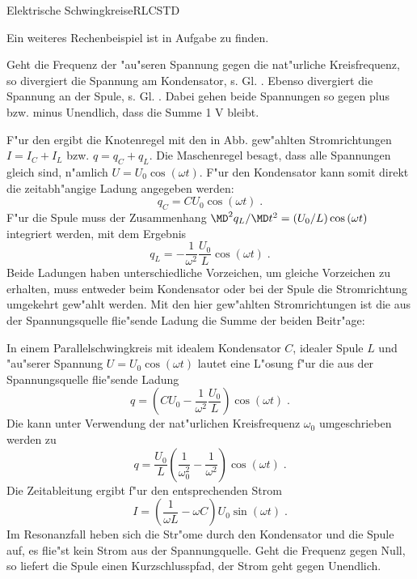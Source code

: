 \begin{MXContent}{Elektrische Schwingkreise}{RLC}{STD}
\begin{MExample}
\end{MExample}

Ein weiteres Rechenbeispiel ist in Aufgabe
zu finden.

Geht die Frequenz der "au"seren Spannung gegen die nat"urliche Kreisfrequenz, so divergiert die Spannung am Kondensator, s. Gl. . Ebenso divergiert die Spannung an der Spule, s. Gl. . Dabei gehen beide Spannungen so gegen plus bzw. minus Unendlich, dass die Summe 1 V bleibt.

F"ur den  ergibt die Knotenregel mit den in Abb.  gew"ahlten Stromrichtungen $I=I_C+I_L$ bzw. $q=q_C+q_L$. Die Maschenregel besagt, dass alle Spannungen gleich sind, n"amlich $U=U_0\cos\left(\omega t\right)$. F"ur den Kondensator kann somit direkt die zeitabh"angige Ladung angegeben werden:
\begin{equation}
  q_C= C U_0 \cos\left(\omega t\right)\; .
\end{equation}
F"ur die Spule muss der Zusammenhang $\MD^2 q_L / \MD t^2 = (U_0/L)\cos\left(\omega t\right)$ integriert werden, mit dem Ergebnis
\begin{equation}
  q_L= -\frac{1}{\omega^2}\frac{U_0}{L} \cos\left(\omega t\right)\; .
\end{equation}
Beide Ladungen haben unterschiedliche Vorzeichen, um gleiche Vorzeichen zu erhalten, muss entweder beim Kondensator oder bei der Spule die Stromrichtung umgekehrt gew"ahlt werden. Mit den hier gew"ahlten Stromrichtungen ist die aus der Spannungsquelle flie"sende Ladung die Summe der beiden Beitr"age:

\begin{MInfo}
In einem Parallelschwingkreis mit idealem Kondensator $C$, idealer Spule $L$ und "au"serer Spannung $U=U_0\cos\left(\omega t\right)$ lautet eine L"osung f"ur die aus der Spannungsquelle flie"sende Ladung
\begin{equation}
q=\left(C U_0 -\frac{1}{\omega^2}\frac{U_0}{L}\right) \cos\left(\omega t\right)\; .
\end{equation}
Die kann unter Verwendung der nat"urlichen Kreisfrequenz $\omega_0$ umgeschrieben werden zu
\begin{equation}
q=\frac{U_0}{L} \left( \frac{1}{\omega_0^2}-\frac{1}{\omega^2}\right) \cos\left(\omega t\right)\; .
\end{equation}
Die Zeitableitung ergibt f"ur den entsprechenden Strom
\begin{equation}
I=\left(\frac{1}{\omega L}-\omega C\right) U_0 \sin\left(\omega t\right)\; .
\end{equation}
Im Resonanzfall heben sich die Str"ome durch den Kondensator und die Spule auf, es flie"st kein Strom aus der Spannungquelle. Geht die Frequenz gegen Null, so liefert die Spule einen Kurzschlusspfad, der Strom geht gegen Unendlich.


\end{MInfo}
\end{MXContent}
